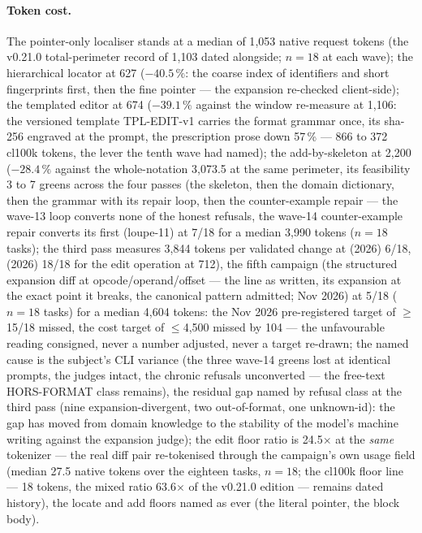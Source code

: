 \documentclass[10pt,a4paper]{article}
\begin{document}
\paragraph{Token cost.} The pointer-only localiser stands at a median
of 1{,}053 native request tokens (the v0.21.0 \mbox{total-perimeter} record
of 1{,}103 dated alongside; $n{=}18$ at each wave); the hierarchical
locator at 627 ($-40.5\,\%$: the coarse index of identifiers and
short fingerprints first, then the fine pointer --- the expansion
re-checked client-side); the templated editor at 674 ($-39.1\,\%$
against the window re-measure at 1{,}106: the versioned template
TPL-EDIT-v1 carries the format grammar once, its sha-256 engraved at
the prompt, the prescription prose down 57\,\% --- 866 to 372 cl100k
tokens, the lever the tenth wave had named); the add-by-skeleton at
2{,}200 ($-28.4\,\%$ against the whole-notation 3{,}073.5 at the same
perimeter, its feasibility 3 to 7 greens across the four passes
(the skeleton, then the domain dictionary, then the grammar with its
repair loop, then the counter-example repair --- the wave-13 loop
converts none of the honest refusals, the wave-14 counter-example
repair converts its first (loupe-11) at 7/18 for a median 3{,}990
tokens ($n{=}18$ tasks); the third pass measures 3{,}844 tokens per validated change at
(2026) 6/18, (2026) 18/18 for the edit operation at 712), the fifth
campaign (the structured expansion diff at
opcode/operand/offset --- the line as written, its expansion at the
exact point it breaks, the canonical pattern admitted; Nov 2026) at
5/18 ($n{=}18$ tasks) for a median
4{,}604 tokens: the
Nov 2026 pre-registered target of $\ge$15/18
missed, the cost target of $\le$4{,}500 missed by 104 --- the
unfavourable reading consigned, never a number adjusted, never a
target re-drawn; the named cause is the subject's CLI variance (the
three wave-14 greens lost at identical prompts, the judges intact, the
chronic refusals unconverted --- the free-text HORS-FORMAT class
remains), the residual gap named by
refusal class at the third pass (nine expansion-divergent, two
out-of-format, one unknown-id): the gap has moved from domain
knowledge to the stability of the model's machine writing against
the expansion judge); the edit floor ratio is
24.5$\times$ at the \emph{same} tokenizer --- the real diff pair
re-tokenised through the campaign's own usage field (median 27.5
native tokens over the eighteen tasks, $n{=}18$; the cl100k floor line --- 18
tokens, the mixed ratio 63.6$\times$ of the v0.21.0 edition ---
remains dated history), the locate and add floors named as ever
(the literal pointer, the block body).
\end{document}
